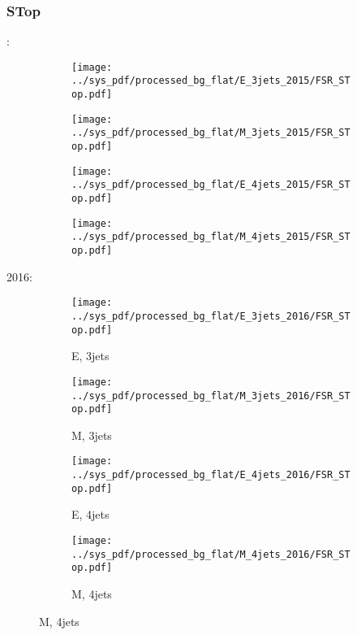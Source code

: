\documentclass{beamer}
\begin{document}
\begin{frame}
\frametitle{STop}
\fontsize{5}{1}:
\begin{figure}
\centering
\begin{subfigure}[b]{0.24\textwidth}
\texttt{[image: ../sys\_pdf/processed\_bg\_flat/E\_3jets\_2015/FSR\_STop.pdf]}
\end{subfigure}
\begin{subfigure}[b]{0.24\textwidth}
\texttt{[image: ../sys\_pdf/processed\_bg\_flat/M\_3jets\_2015/FSR\_STop.pdf]}
\end{subfigure}
\begin{subfigure}[b]{0.24\textwidth}
\texttt{[image: ../sys\_pdf/processed\_bg\_flat/E\_4jets\_2015/FSR\_STop.pdf]}
\end{subfigure}
\begin{subfigure}[b]{0.24\textwidth}
\texttt{[image: ../sys\_pdf/processed\_bg\_flat/M\_4jets\_2015/FSR\_STop.pdf]}
\end{subfigure}
\end{figure}
2016:
\begin{figure}
\centering
\begin{subfigure}[b]{0.24\textwidth}
\texttt{[image: ../sys\_pdf/processed\_bg\_flat/E\_3jets\_2016/FSR\_STop.pdf]}
\captionsetup{font=tiny}
\caption{E, 3jets}
\end{subfigure}
\begin{subfigure}[b]{0.24\textwidth}
\texttt{[image: ../sys\_pdf/processed\_bg\_flat/M\_3jets\_2016/FSR\_STop.pdf]}
\captionsetup{font=tiny}
\caption{M, 3jets}
\end{subfigure}
\begin{subfigure}[b]{0.24\textwidth}
\texttt{[image: ../sys\_pdf/processed\_bg\_flat/E\_4jets\_2016/FSR\_STop.pdf]}
\captionsetup{font=tiny}
\caption{E, 4jets}
\end{subfigure}
\begin{subfigure}[b]{0.24\textwidth}
\texttt{[image: ../sys\_pdf/processed\_bg\_flat/M\_4jets\_2016/FSR\_STop.pdf]}
\captionsetup{font=tiny}
\caption{M, 4jets}
\end{subfigure}
\end{figure}
\end{frame}
\end{document}
